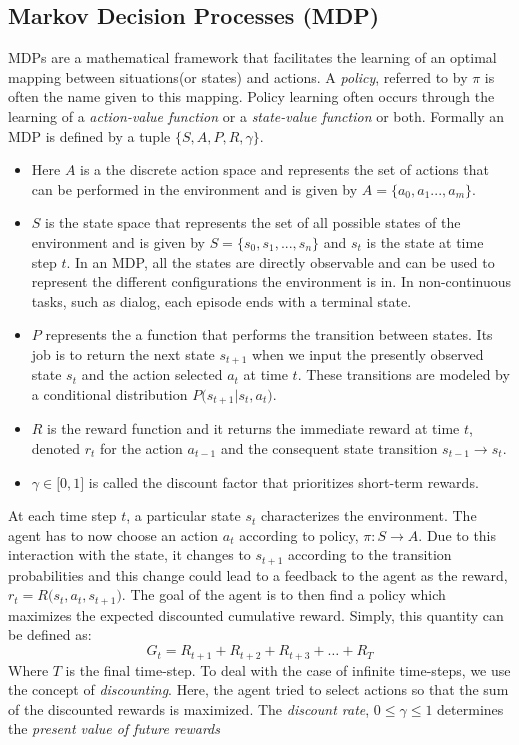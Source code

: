 \documentclass[12pt]{extarticle}
\numberwithin{equation}{section}
\begin{document}
	\subsection{Markov Decision Processes (MDP)} \label{subsec:mdp}
	MDPs are a mathematical framework that facilitates the learning of an optimal mapping between situations(or states) and actions\cite{Sutton-introRL}. A \textit{policy}, referred to by $\pi$ is often the name given to this mapping. Policy learning often occurs through the learning of a \textit{action-value function} or a \textit{state-value function} or both. Formally an MDP is defined by a tuple ${\big\{S,A,P,R, \gamma \big\}}$.
	\begin{itemize}
		\item Here $A$ is a the discrete action space and represents the set of actions that can be performed in the environment and is given by $A = \{a_0,a_1...,a_m\}$. 
		\item $S$ is the state space that represents the set of all possible states of the environment and is given by $S = \{s_0,s_1,...,s_n\}$ and $s_t$ is the state at time step $t$. In an MDP, all the states are directly observable and can be used to represent the different configurations the environment is in. In non-continuous tasks, such as dialog, each episode ends with a terminal state.
		\item $P$ represents the a function that performs the transition between states. Its job is to return the next state $s_{t+1}$ when we input the presently observed state $s_t$ and the action selected $a_t$ at time $t$. These transitions are modeled by a conditional distribution $P\big(s_{t+1}|s_t,a_t\big)$.
		\item $R$ is the reward function and it returns the immediate reward at time $t$, denoted $r_t$ for the action $a_{t-1} $ and the consequent state transition $s_{t-1} \rightarrow s_t$.
		\item  $\gamma \in \big[0,1\big] $ is called the discount factor that prioritizes short-term rewards.
	\end{itemize}
	At each time step $t$, a particular state $s_t$ characterizes the environment. The agent has to now choose an action $a_t$ according to policy, $\pi : S \rightarrow A$. Due to this interaction with the state, it changes to $s_{t+1}$ according to the transition probabilities and this change could lead to a feedback to the agent as the reward, $r_t = R\big(s_t,a_t,s_{t+1}\big)$. 
	The goal of the agent is to then find a policy which maximizes the expected discounted cumulative reward. Simply, this quantity can be defined as:
	\begin{equation}
	G_t = R_{t+1}+R_{t+2}+R_{t+3}+ \ldots + R_T \label{eq:1}
	\end{equation}
	Where $T$ is the final time-step. To deal with the case of infinite time-steps, we use the concept of \textit{discounting}. Here, the agent tried to select actions so that the sum of the discounted rewards is maximized. The \textit{discount rate}, $0 \leq \gamma \leq 1$ determines the \textit{present value of future rewards}\cite{Sutton-introRL}
	
\end{document}

